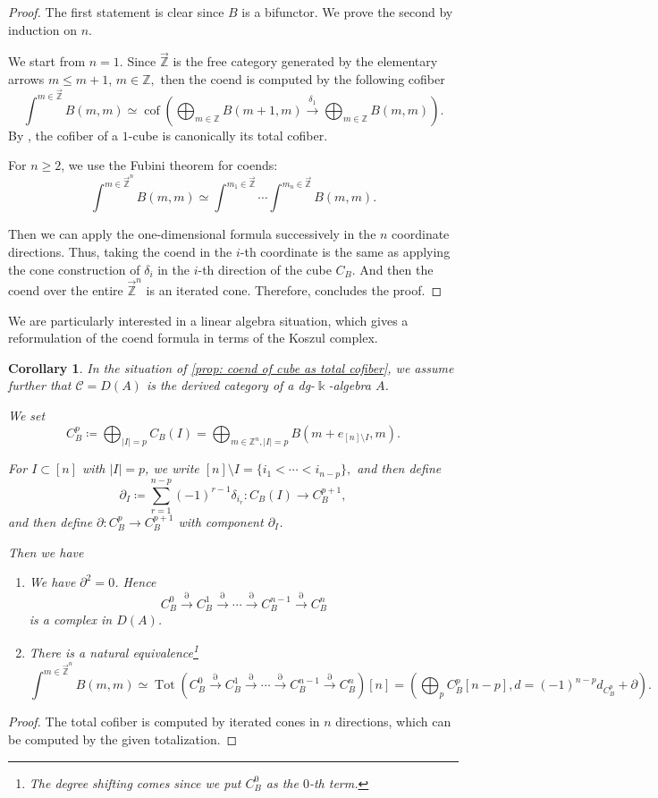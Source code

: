 \documentclass[11pt]{amsart}
\numberwithin{equation}{section}
\theoremstyle{plain}
\newtheorem{Coro}[coro]{Corollary}
\theoremstyle{definition}
\theoremstyle{remark}
\newcommand{\bZ} { {\mathbb{Z}}}
\newcommand{\cC} { {\mathcal{C}}}
\newcommand\cof{\operatorname{cof}}
\newcommand{\rarbZ} { \overrightarrow{\mathbb{Z}}}
\begin{document}
\begin{proof}
The first statement is clear since $B$ is a bifunctor. We prove the second by induction on $n$.

We start from $n=1$. Since $\rarbZ$ is the free category generated by the elementary arrows 
$
m\leq m+1$, $
 m\in\bZ, 
$
then the coend is computed by the following cofiber
\[
\int^{m\in\rarbZ}B(m,m)
\simeq
\cof\left(
\bigoplus_{m\in\bZ}B(m+1,m)
\xrightarrow{\delta_1}
\bigoplus_{m\in\bZ}B(m,m)
\right).
\]
By \cite[Remark 8.5(i)]{BeckertGroth_Cubical_homotopy}, the cofiber of a $1$-cube is
canonically its total cofiber. 

For $n\geq 2$, we use the Fubini theorem for coends:
\[
\int^{m\in\rarbZ^n}B(m,m)
\simeq
\int^{m_1\in\rarbZ}
\cdots
\int^{m_n\in\rarbZ}
B(m,m).
\]

Then we can apply the one-dimensional formula successively in the $n$
coordinate directions. Thus, taking the coend in the $i$-th coordinate is the same as applying the cone construction of $\delta_i$ in the $i$-th direction of the cube $C_B$. And then the coend over the entire $\rarbZ^n$ is an iterated cone. Therefore, \cite[Theorem 8.25]{BeckertGroth_Cubical_homotopy} concludes the proof.
\end{proof}
 
We are particularly interested in a linear algebra situation, which gives a reformulation of the coend formula in terms of the Koszul complex.
\begin{Coro}\label{coro: coend computing in chain}
    In the situation of \autoref{prop: coend of cube as total cofiber}, we assume further that $\cC=D(A)$ is the derived category of a dg-$\Bbbk$-algebra $A$. 
    
    We set
\[
C_B^p\coloneqq \bigoplus_{|I|=p} C_B(I)=
\bigoplus_{{m\in\bZ^n, |I|=p}}
B(m+e_{[n]\setminus I},m).
\]

For $I\subset[n]$ with $|I|=p$, we write $ [n]\setminus I=\{i_1<\cdots<i_{n-p}\}, $ and then define 
\[ \partial_I \coloneqq \sum_{r=1}^{n-p} (-1)^{r-1}\delta_{i_r}: C_B(I)\longrightarrow C_B^{p+1}, \]
and then define $\partial: C_B^{p}\to C_B^{p+1}$ with component $\partial_I$.


Then we have
\begin{enumerate}[fullwidth] \item We have $ \partial^2=0$. Hence \[ C_B^0\xrightarrow{\partial} C_B^1\xrightarrow{\partial}\cdots \xrightarrow{\partial}C_B^{n-1} \xrightarrow{\partial}C_B^n \] is a complex in $D(A)$.  \item There is a natural equivalence\footnote{The degree shifting comes since we put $C^0_B$ as the $0$-th term.} \[ \int^{m\in\rarbZ^n}B(m,m) \simeq \operatorname{Tot} \left( C_B^0\xrightarrow{\partial} C_B^1\xrightarrow{\partial}\cdots \xrightarrow{\partial}C_B^{n-1} \xrightarrow{\partial}C_B^n  \right)[n]=\left(\bigoplus_p C_B^p[n-p],d=(-1)^{n-p}d_{C^p_B}+\partial\right). \] 

\end{enumerate}
\end{Coro}
\begin{proof}
The total cofiber is computed by iterated cones in $n$ directions, which can be computed by the given totalization.
\end{proof}
\end{document}
